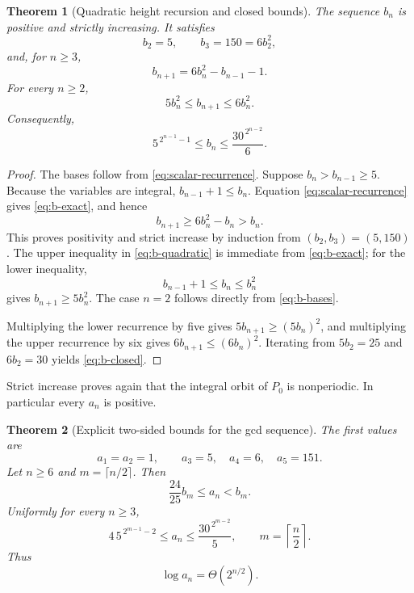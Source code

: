 \documentclass[11pt]{article}
\numberwithin{equation}{section}
\newtheorem{theorem}{Theorem}[section]
\theoremstyle{remark}
\begin{document}
\begin{theorem}[Quadratic height recursion and closed bounds]
\label{thm:height}
The sequence \(b_n\) is positive and strictly increasing.  It satisfies
\begin{equation}
 b_2=5,\qquad b_3=150=6b_2^2,
 \label{eq:b-bases}
\end{equation}
and, for \(n\ge3\),
\begin{equation}
 b_{n+1}=6b_n^2-b_{n-1}-1.
 \label{eq:b-exact}
\end{equation}
For every \(n\ge2\),
\begin{equation}
 5b_n^2\le b_{n+1}\le6b_n^2.
 \label{eq:b-quadratic}
\end{equation}
Consequently,
\begin{equation}
 5^{\,2^{n-1}-1}
 \le b_n\le
 \frac{30^{\,2^{n-2}}}{6}.
 \label{eq:b-closed}
\end{equation}
\end{theorem}

\begin{proof}
The bases follow from \eqref{eq:scalar-recurrence}.  Suppose
\(b_n>b_{n-1}\ge5\).  Because the variables are integral,
\(
b_{n-1}+1\le b_n
\).
Equation \eqref{eq:scalar-recurrence} gives \eqref{eq:b-exact}, and hence
\[
 b_{n+1}
 \ge6b_n^2-b_n
 >b_n.
\]
This proves positivity and strict increase by induction from
\((b_2,b_3)=(5,150)\).  The upper inequality in \eqref{eq:b-quadratic} is
immediate from \eqref{eq:b-exact}; for the lower inequality,
\[
 b_{n-1}+1\le b_n\le b_n^2
\]
gives
\(
b_{n+1}\ge5b_n^2
\).
The case \(n=2\) follows directly from \eqref{eq:b-bases}.

Multiplying the lower recurrence by five gives
\(
5b_{n+1}\ge(5b_n)^2
\),
and multiplying the upper recurrence by six gives
\(
6b_{n+1}\le(6b_n)^2
\).
Iterating from \(5b_2=25\) and \(6b_2=30\) yields
\eqref{eq:b-closed}.
\end{proof}

Strict increase proves again that the integral orbit of \(P_0\) is
nonperiodic.  In particular every \(a_n\) is positive.

\begin{theorem}[Explicit two-sided bounds for the gcd sequence]
\label{thm:gcd-height}
The first values are
\begin{equation}
 a_1=a_2=1,\qquad
 a_3=5,\quad a_4=6,\quad a_5=151.
 \label{eq:a-bases}
\end{equation}
Let \(n\ge6\) and \(m=\lceil n/2\rceil\).  Then
\begin{equation}
 \frac{24}{25}b_m\le a_n<b_m.
 \label{eq:a-sharp-comparison}
\end{equation}
Uniformly for every \(n\ge3\),
\begin{equation}
 4\,5^{\,2^{m-1}-2}
 \le a_n\le
 \frac{30^{\,2^{m-2}}}{5},
 \qquad m=\left\lceil\frac n2\right\rceil.
 \label{eq:a-closed}
\end{equation}
Thus
\begin{equation}
 \log a_n=\Theta(2^{n/2}).
 \label{eq:log-height}
\end{equation}
\end{theorem}
\end{document}
